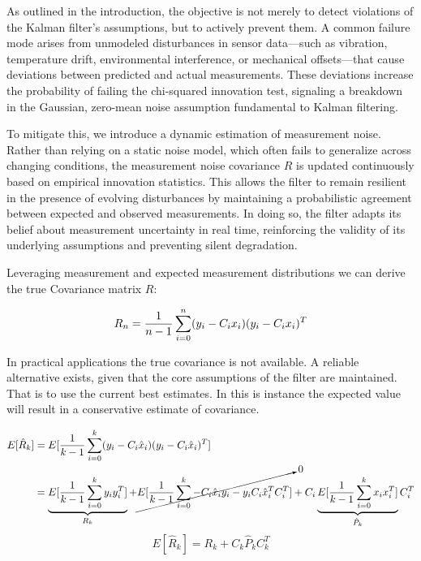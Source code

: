 \documentclass[a4paper]{article}
\begin{document}
As outlined in the introduction, the objective is not merely to detect violations of the Kalman filter’s assumptions, but to actively prevent them. A common failure mode arises from unmodeled disturbances in sensor data—such as vibration, temperature drift, environmental interference, or mechanical offsets—that cause deviations between predicted and actual measurements. These deviations increase the probability of failing the chi-squared innovation test, signaling a breakdown in the Gaussian, zero-mean noise assumption fundamental to Kalman filtering.

To mitigate this, we introduce a dynamic estimation of measurement noise. Rather than relying on a static noise model, which often fails to generalize across changing conditions, the measurement noise covariance \( R \) is updated continuously based on empirical innovation statistics. This allows the filter to remain resilient in the presence of evolving disturbances by maintaining a probabilistic agreement between expected and observed measurements. In doing so, the filter adapts its belief about measurement uncertainty in real time, reinforcing the validity of its underlying assumptions and preventing silent degradation.

	Leveraging measurement and expected measurement distributions we can derive the true Covariance matrix $R$:

	\begin{equation}
		R_n = {1 \over n - 1} \displaystyle\sum_{i=0} ^{n} (y_i - C_i x_i) (y_i - C_i x_i)^T
	\end{equation}

	In practical applications the true covariance is not available. A reliable alternative exists, given that the core assumptions of the filter are maintained. That is to use the current best estimates. In this is instance the expected value will result in a conservative estimate of covariance.

	\begin{align*}
		E[\hat{R}_k] &= E[{1 \over k - 1} \displaystyle\sum_{i=0} ^{k} (y_i - C_i \hat{x}_i) (y_i - C_i \hat{x}_i)^T]\\
		&= \underbrace{E[{1 \over k - 1} \displaystyle\sum_{i=0} ^{k} y_iy_i^T]}_{R_k} + \cancelto{0}{E[{1 \over k - 1} \displaystyle\sum_{i=0} ^{k} -C_i \hat{x}_i y_i - y_i C_i \hat{x}_i^T C_i^T]} + C_i \underbrace{E[{1 \over k - 1} \displaystyle\sum_{i=0}^{k} x_ix_i^T]}_{\hat{P}_k} C_i^T\\
	\end{align*}
	\begin{equation}
		E[\hat{R}_k] = R_k + C_k \hat{P}_k C_k^T
		\label{eq:exp_meas_cov}
	\end{equation}
\end{document}
